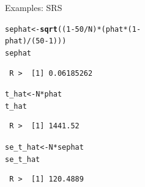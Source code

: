 \documentclass[10pt]{beamer}\usepackage[]{graphicx}\usepackage[]{xcolor}
\makeatletter
\newcommand{\hlnum}[1]{\textcolor[rgb]{0.686,0.059,0.569}{#1}}%
\newcommand{\hlopt}[1]{\textcolor[rgb]{0,0,0}{#1}}%
\newcommand{\hlstd}[1]{\textcolor[rgb]{0.345,0.345,0.345}{#1}}%
\newcommand{\hlkwb}[1]{\textcolor[rgb]{0.69,0.353,0.396}{#1}}%
\newcommand{\hlkwd}[1]{\textcolor[rgb]{0.737,0.353,0.396}{\textbf{#1}}}%
\newenvironment{kframe}{%
 \def\at@end@of@kframe{}%
 \ifinner\ifhmode%
  \def\at@end@of@kframe{\end{minipage}}%
  \begin{minipage}{\columnwidth}%
 \fi\fi%
 \def\FrameCommand##1{\hskip\@totalleftmargin \hskip-\fboxsep
 \colorbox{shadecolor}{##1}\hskip-\fboxsep
     \hskip-\linewidth \hskip-\@totalleftmargin \hskip\columnwidth}%
 \MakeFramed {\advance\hsize-\width
   \@totalleftmargin\z@ \linewidth\hsize
   \@setminipage}}%
 {\par\unskip\endMakeFramed%
 \at@end@of@kframe}
\newenvironment{knitrout}{}{} %
\makeatother
\begin{document}
\begin{frame}[containsverbatim]{Examples: SRS}
\tiny
\begin{knitrout}
\color{fgcolor}\begin{kframe}
\begin{alltt}
\hlstd{sephat} \hlkwb{<-} \hlkwd{sqrt}\hlstd{((}\hlnum{1} \hlopt{-} \hlnum{50}\hlopt{/}\hlstd{N)} \hlopt{*} \hlstd{(phat} \hlopt{*} \hlstd{(}\hlnum{1} \hlopt{-}
    \hlstd{phat)}\hlopt{/}\hlstd{(}\hlnum{50} \hlopt{-} \hlnum{1}\hlstd{)))}
\hlstd{sephat}
\end{alltt}
\begin{verbatim}
 R >  [1] 0.06185262
\end{verbatim}
\begin{alltt}
\hlstd{t_hat} \hlkwb{<-} \hlstd{N} \hlopt{*} \hlstd{phat}
\hlstd{t_hat}
\end{alltt}
\begin{verbatim}
 R >  [1] 1441.52
\end{verbatim}
\begin{alltt}
\hlstd{se_t_hat} \hlkwb{<-} \hlstd{N} \hlopt{*} \hlstd{sephat}
\hlstd{se_t_hat}
\end{alltt}
\begin{verbatim}
 R >  [1] 120.4889
\end{verbatim}
\end{kframe}
\end{knitrout}
\end{frame}
\end{document}

